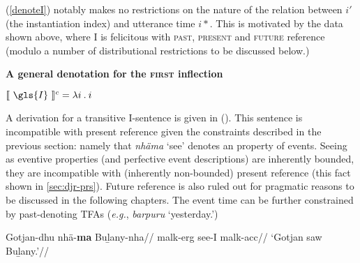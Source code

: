 (\ref{denoteI}) notably makes no restrictions on the nature of the relation between $ i' $ (the instantiation index) and utterance time $ i* $. This is motivated by the data shown above, where \gls{I} is felicitous with \textsc{past, present} and \textsc{future} reference (modulo a number of distributional restrictions to be discussed below.)

\begin{shaded}
\pex\textbf{A general denotation for the \textsc{first} inflection}
\label{denoteI}

$ \denote[c]{~\gls{I}~}=\lambda i\mathbin.i $
\xe

\end{shaded}

A derivation for a transitive \gls{I}-sentence is given in (\nextx). This sentence is incompatible with present reference given the constraints described in the previous section: namely that \textit{nhäma} `see' denotes an property of events. Seeing as eventive properties (and perfective event descriptions) are inherently bounded, they are incompatible with (inherently non-bounded) present reference (this fact shown in  \ref{sec:djr-prs}). Future reference is also ruled out for pragmatic reasons to be discussed in the following chapters.
The event time can be further constrained by past-denoting TFAs (\textit{e.g.}, \textit{barpuru} `yesterday.')

\pex\begingl\gla Gotjan-dhu nhä-\textbf{ma} Buḻany-nha//
\glb \gls{malk}-\gls{erg} see-\gls{I} \gls{malk}-\gls{acc}//
\glft`Gotjan saw Buḻany.'//\endgl

\xe

